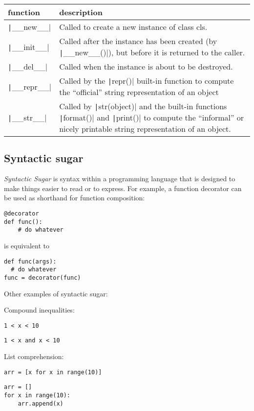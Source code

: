 \documentclass{article}
\begin{document}
\begin{table}
\begin{tabular}{l p{10cm}}
  function & description\\\toprule
  \texttt|__new__| & Called to create a new instance of class cls.\\\cmidrule{2-2}
  \texttt|__init__| & Called after the instance has been created (by \texttt|__new__()|), but before it is returned to the caller.\\\cmidrule{2-2}
  \texttt|__del__| & Called when the instance is about to be destroyed.\\\cmidrule{2-2}
  \texttt|__repr__| & Called by the \texttt|repr()| built-in function to compute the ``official'' string representation of an object\\\cmidrule{2-2}
  \texttt|__str__| & Called by \texttt|str(object)| and the built-in functions \texttt|format()| and \texttt|print()| to compute the ``informal'' or nicely printable string representation of an object.
\end{tabular}
\end{table}
\subsection{Syntactic sugar}
\emph{Syntactic Sugar} is syntax within a programming language that is designed to make things
easier to read or to express. For example, a function decorator can be used as shorthand
for function composition:
\begin{verbatim}
@decorator
def func():
    # do whatever
\end{verbatim}
is equivalent to
\begin{verbatim}
def func(args):
  # do whatever
func = decorator(func)
\end{verbatim}
Other examples of syntactic sugar:

Compound inequalities:
\begin{multicols}{2}
\begin{verbatim}
1 < x < 10
\end{verbatim}
\begin{verbatim}
1 < x and x < 10
\end{verbatim}
\end{multicols}
List comprehension:
\begin{multicols}{2}
\begin{verbatim}
arr = [x for x in range(10)]
\end{verbatim}
\vfill\null
\columnbreak
\begin{verbatim}
arr = []
for x in range(10):
    arr.append(x)
\end{verbatim}
\end{multicols}
\end{document}

